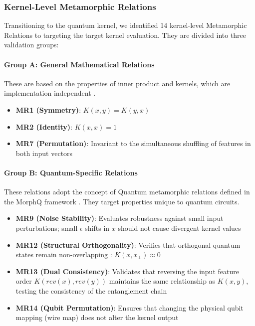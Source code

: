 \documentclass[12pt,a4paper]{article}
\begin{document}
	\subsubsection{Kernel-Level Metamorphic Relations}
	\label{sec:kernel_mrs}
	
	Transitioning to the quantum kernel, we identified 14 kernel-level Metamorphic Relations to targeting the target kernel evaluation. They are divided into three validation groups:
	
	\paragraph{Group A: General Mathematical Relations}
	These are based on the properties of inner product and kernels, which are implementation independent \cite{schuld2019}.
	\begin{itemize}
		\item \textbf{MR1 (Symmetry)}: $K(x,y) = K(y,x)$ 
		\item \textbf{MR2 (Identity)}: $K(x,x) = 1$
		\item \textbf{MR7 (Permutation)}: Invariant to the simultaneous shuffling of features in both input vectors \cite{xie2011}
	\end{itemize}
	
	\paragraph{Group B: Quantum-Specific Relations}
	These relations adopt the concept of Quantum metamorphic relations defined in the MorphQ framework \cite{Paltenghi2023}. They target properties unique to quantum circuits.
	
	\begin{itemize}
		\item \textbf{MR9 (Noise Stability)}: Evaluates robustness against small input perturbations; small $\epsilon$ shifts in $x$ should not cause divergent kernel values
		\item \textbf{MR12 (Structural Orthogonality)}: Verifies that orthogonal quantum states remain non-overlapping \cite{schuld2019}: $K(x, x_{\perp}) \approx 0$
		\item \textbf{MR13 (Dual Consistency)}: Validates that reversing the input feature order $K(rev(x), rev(y))$ maintains the same relationship as $K(x, y)$, testing the consistency of the entanglement chain \cite{Paltenghi2023}
		\item \textbf{MR14 (Qubit Permutation)}: Ensures that changing the physical qubit mapping (wire map) does not alter the kernel output \cite{Paltenghi2023}
	\end{itemize}
	
\end{document}

